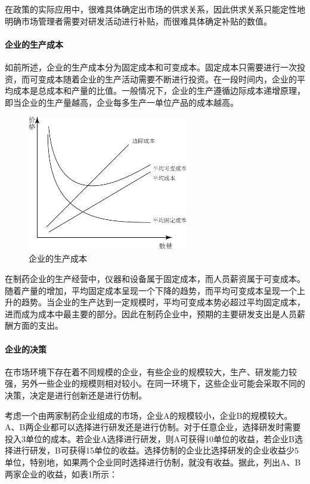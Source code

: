 \documentclass{apa6}
\begin{document}
			在政策的实际应用中，很难具体确定出市场的供求关系，因此供求关系只能定性地明确市场管理者需要对研发活动进行补贴，而很难具体确定补贴的数值\citep{RN13}。
			
			\paragraph{企业的生产成本}
			
			如前所述，企业的生产成本分为固定成本和可变成本。固定成本只需要进行一次投资，而可变成本随着企业的生产活动需要不断进行投资。在一段时间内，企业的平均成本是总成本和产量的比值。一般情况下，企业的生产遵循边际成本递增原理，即当企业的生产量越高，企业每多生产一单位产品的成本越高。
			
			\begin{figure}[ht]
				\centering
				\includegraphics[width=7cm]{fig7.png} %
				\caption{企业的生产成本}
				\label{fig:fig7}
			\end{figure}
			
			在制药企业的生产经营中，仪器和设备属于固定成本，而人员薪资属于可变成本。随着产量的增加，平均固定成本呈现一个下降的趋势，而平均可变成本呈现一个上升的趋势。当企业的生产达到一定规模时，平均可变成本势必超过平均固定成本，进而成为成本中最主要的部分。因此在制药企业中，预期的主要研发支出是人员薪酬方面的支出。
			
			\paragraph{企业的决策}
			
			在市场环境下存在着不同规模的企业，有些企业的规模较大，生产、研发能力较强，另外一些企业的规模则相对较小。在同一环境下，这些企业可能会采取不同的决策，决定是进行创新还是进行仿制。
			
			考虑一个由两家制药企业组成的市场，企业A的规模较小，企业B的规模较大。A、B两企业都可以选择进行研发还是进行仿制。对于任意企业，选择研发时需要投入3单位的成本。若企业A选择进行研发，则A可获得10单位的收益，若企业B选择进行研发，B可获得15单位的收益。选择仿制的企业比选择研发的企业收益少5单位，特别地，如果两个企业同时选择进行仿制，就没有收益。据此，列出A、B两家企业的收益，如表1所示：
			
\end{document}
